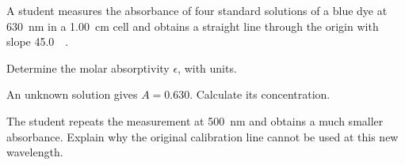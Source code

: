 \documentclass{apchem-exam}
\begin{document}

A student measures the absorbance of four standard solutions of a blue dye
at \SI{630}{\nano\meter} in a \SI{1.00}{\centi\meter} cell and obtains a
straight line through the origin with slope
\SI{45.0}{\per\Molar}.

\begin{parts}
  \item Determine the molar absorptivity $\epsilon$, with units.
  \item An unknown solution gives $A = 0.630$. Calculate its
        concentration. \workspace[2cm]
  \item The student repeats the measurement at \SI{500}{\nano\meter} and
        obtains a much smaller absorbance. Explain why the original
        calibration line cannot be used at this new wavelength.
\end{parts}

\begin{rubric}
\end{rubric}

\examtotal
\end{document}
